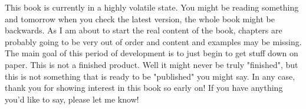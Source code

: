 \documentclass[../OpenAppliedMusicTheory.tex]{subfiles}
\begin{document}
    
    
    This book is currently in a highly volatile state. You might be reading something and tomorrow when you check the latest version, the whole book might be backwards. As I am about to start the real content of the book, chapters are probably going to be very out of order and content and examples may be missing. The main goal of this period of development is to just begin to get stuff down on paper. This is not a finished product. Well it might never be truly "finished", but this is not something that is ready to be "published" you might say. In any case, thank you for showing interest in this book so early on! If you have anything you'd like to say, please let me know! 

\end{document}
